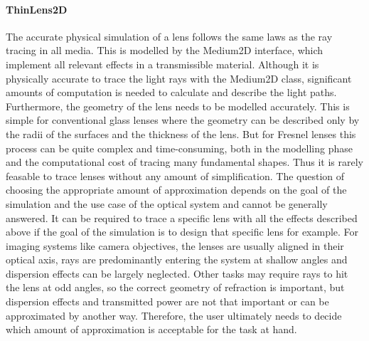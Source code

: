 \documentclass[a4paper,10pt]{article}
\begin{document}
    \paragraph{ThinLens2D}

    The accurate physical simulation of a lens follows the same laws
    as the ray tracing in all media.
    This is modelled by the Medium2D interface, which implement all
    relevant effects in a transmissible material.
    Although it is physically accurate to trace the light rays with
    the Medium2D class, significant amounts of computation is needed
    to calculate and describe the light paths.
    Furthermore, the geometry of the lens needs to be modelled accurately.
    This is simple for conventional glass lenses where the geometry can be
    described only by the radii of the surfaces and the thickness of the lens.
    But for Fresnel lenses this process can be quite complex and time-consuming,
    both in the modelling phase and the computational cost
    of tracing many fundamental shapes.
    Thus it is rarely feasable to trace lenses without any amount
    of simplification.
    The question of choosing the appropriate amount of approximation depends on the goal of the
    simulation and the use case of the optical system and cannot be
    generally answered.
    It can be required to trace a specific lens with all the effects described
    above if the goal of the simulation is to design that specific lens
    for example.
    For imaging systems like camera objectives, the lenses are usually
    aligned in their optical axis, rays are predominantly 
    entering the system at shallow angles and dispersion effects can 
    be largely neglected.
    Other tasks may require rays to hit the lens at odd angles, so the
    correct geometry of refraction is important, but dispersion effects
    and transmitted power are not that important or can be 
    approximated by another way.
    Therefore, the user ultimately needs to decide which amount of 
    approximation is acceptable for the task at hand.        
\end{document}
